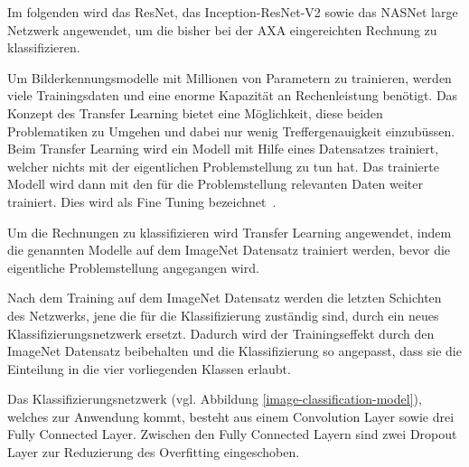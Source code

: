 


Im folgenden wird das ResNet, das Inception-ResNet-V2 sowie das NASNet large Netzwerk angewendet, um die bisher bei der AXA eingereichten Rechnung zu klassifizieren.

Um Bilderkennungsmodelle mit Millionen von Parametern zu trainieren, werden viele Trainingsdaten und eine enorme Kapazität an Rechenleistung benötigt. Das Konzept des Transfer Learning bietet eine Möglichkeit, diese beiden Problematiken zu Umgehen und dabei nur wenig Treffergenauigkeit einzubüssen. Beim Transfer Learning wird ein Modell mit Hilfe eines Datensatzes trainiert, welcher nichts mit der eigentlichen Problemstellung zu tun hat. Das trainierte Modell wird dann mit den für die Problemstellung relevanten Daten weiter trainiert. Dies wird als Fine Tuning bezeichnet~\autocite{TensorflowImageRetraining, TDSTransferLearning}.

Um die Rechnungen zu klassifizieren wird Transfer Learning angewendet, indem die genannten Modelle auf dem ImageNet Datensatz trainiert werden, bevor die eigentliche Problemstellung angegangen wird.

Nach dem Training auf dem ImageNet Datensatz werden die letzten Schichten des Netzwerks, jene die für die Klassifizierung zuständig sind, durch ein neues Klassifizierungsnetzwerk ersetzt. Dadurch wird der Trainingseffekt durch den ImageNet Datensatz beibehalten und die Klassifizierung so angepasst, dass sie die Einteilung in die vier vorliegenden Klassen erlaubt.

Das Klassifizierungsnetzwerk (vgl. Abbildung \ref{image-classification-model}), welches zur Anwendung kommt, besteht aus einem Convolution Layer sowie drei Fully Connected Layer. Zwischen den Fully Connected Layern sind zwei Dropout Layer zur Reduzierung des Overfitting eingeschoben.

